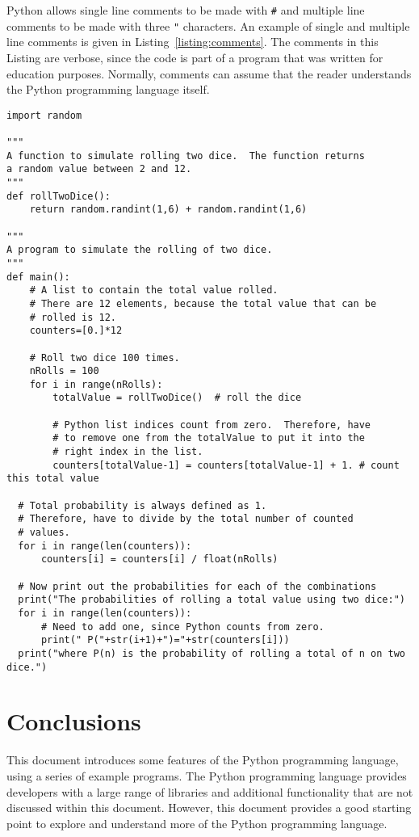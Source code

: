 \documentclass[11pt,a4paper]{article}
\begin{document}
Python allows single line comments to be made with \texttt{\#} and multiple line comments to be made with three \texttt{"} characters.  An example of single and multiple line comments is given in Listing~\ref{listing:comments}.  The comments in this Listing are verbose, since the code is part of a program that was written for education purposes.  Normally, comments can assume that the reader understands the Python programming language itself.

\begin{lstlisting}[caption={Python comments.},label=listing:comments]
import random

"""
A function to simulate rolling two dice.  The function returns
a random value between 2 and 12.
"""
def rollTwoDice():
    return random.randint(1,6) + random.randint(1,6)

"""
A program to simulate the rolling of two dice.
"""
def main():
    # A list to contain the total value rolled.
    # There are 12 elements, because the total value that can be
    # rolled is 12.
    counters=[0.]*12

    # Roll two dice 100 times.
    nRolls = 100
    for i in range(nRolls):
        totalValue = rollTwoDice()  # roll the dice

        # Python list indices count from zero.  Therefore, have 
        # to remove one from the totalValue to put it into the 
        # right index in the list.
        counters[totalValue-1] = counters[totalValue-1] + 1. # count this total value

  # Total probability is always defined as 1.
  # Therefore, have to divide by the total number of counted
  # values.
  for i in range(len(counters)):
      counters[i] = counters[i] / float(nRolls)
  
  # Now print out the probabilities for each of the combinations
  print("The probabilities of rolling a total value using two dice:")
  for i in range(len(counters)):
      # Need to add one, since Python counts from zero.
      print(" P("+str(i+1)+")="+str(counters[i]))
  print("where P(n) is the probability of rolling a total of n on two dice.")
\end{lstlisting}

\section{Conclusions}

This document introduces some features of the Python programming language, using a series of example programs.  The Python programming language provides developers with a large range of libraries and additional functionality that are not discussed within this document.  However, this document provides a good starting point to explore and understand more of the Python programming language.



\end{document}
